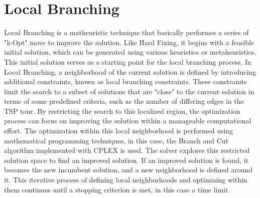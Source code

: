 \section{Local Branching}

Local Branching is a matheuristic technique that basically performes a series of "k-Opt" move to improve the solution.
Like Hard Fixing, it begins with a feasible initial solution, which can be generated using various heuristics or metaheuristics.
This initial solution serves as a starting point for the local branching process.
In Local Branching, a neighborhood of the current solution is defined by introducing additional constraints, known as local branching constraints.
These constraints limit the search to a subset of solutions that are "close" to the current solution in terms of some predefined criteria, such as the number of differing edges in the TSP tour.
By restricting the search to this localized region, the optimization process can focus on improving the solution within a manageable computational effort.
The optimization within this local neighborhood is performed using mathematical programming techniques, in this case, the Branch and Cut algorithm implemented with CPLEX is used.
The solver explores this restricted solution space to find an improved solution.
If an improved solution is found, it becomes the new incumbent solution, and a new neighborhood is defined around it.
This iterative process of defining local neighborhoods and optimizing within them continues until a stopping criterion is met, in this case a time limit.


